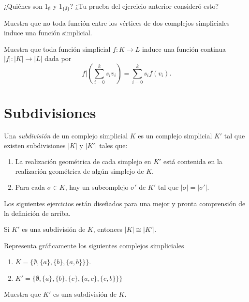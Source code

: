 \documentclass{standalone}
\begin{document}
	\begin{exercise}
		¿Quiénes son $1_{\emptyset}$ y $1_{\{\emptyset\}}$? ¿Tu prueba del ejercicio anterior consideró esto?
	\end{exercise}
	
	\begin{exercise}\label{rem:coeherent_gluing}
		Muestra que no toda función entre los vértices de dos complejos simpliciales induce una función simplicial. 
	\end{exercise}
	
	\begin{exercise}
		Muestra que toda función simplicial $f\colon K\rightarrow L$ induce una función continua $|f|\colon |K|\rightarrow |L|$ dada por 
		\[
		|f|(\sum_{i=0}^{k}s_{i}v_{i})= \sum_{i=0}^{k}s_{i}f(v_{i}).
		\]
	\end{exercise}
	
	\section{Subdivisiones}
	\begin{definition}\label{def:subdivision}
		Una \emph{subdivisión} de un complejo simplicial $K$ es un complejo simplicial $K'$ tal que existen subdivisiones $|K|$ y $|K'|$ tales que:
		
		\begin{enumerate}
			\item La realización geométrica de cada simplejo en $K'$ está contenida en la realización geométrica de algún simplejo de $K$.
			\item Para cada $\sigma\in K$, hay un subcomplejo $\sigma'$ de $K'$ tal que $|\sigma|=|\sigma'|$.
		\end{enumerate}
	\end{definition}
	
	Los siguientes ejercicios están diseñados para una mejor y pronta comprensión de la definición de arriba.
	
	\begin{exercise}
		Si $K'$ es una subdivisión de $K$, entonces $|K|\cong|K'|$.
	\end{exercise}
	
	\begin{exercise}
		Representa gráficamente los siguientes complejos simpliciales
		\begin{enumerate}
			\item  $K=\{\emptyset, \{a\}, \{b\}, \{a,b\}\}\}$.
			\item  $K'=\{\emptyset, \{a\}, \{b\}, \{c\}, \{a,c\}, \{c,b\}\}\}$
		\end{enumerate}
		Muestra que $K'$ es una subdivisión de $K$.
	\end{exercise}
	
\end{document}
